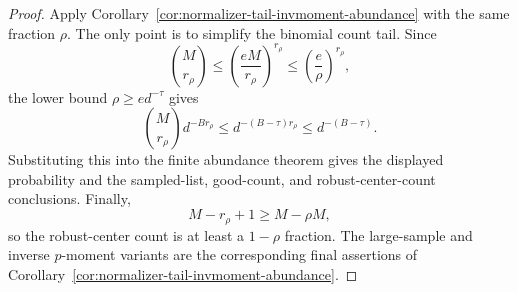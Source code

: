 \documentclass[11pt]{amsart}
\numberwithin{equation}{section}
\theoremstyle{definition}
\theoremstyle{remark}
\begin{document}
\begin{proof}
Apply Corollary~\ref{cor:normalizer-tail-invmoment-abundance} with the same
fraction \(\rho\).  The only point is to simplify the binomial count tail.  Since
\[
  \binom{M}{r_\rho}
  \le \left(\frac{eM}{r_\rho}\right)^{r_\rho}
  \le \left(\frac e\rho\right)^{r_\rho},
\]
the lower bound \(\rho\ge e d^{-\tau}\) gives
\[
  \binom{M}{r_\rho}d^{-B r_\rho}
  \le d^{-(B-\tau)r_\rho}
  \le d^{-(B-\tau)} .
\]
Substituting this into the finite abundance theorem gives the displayed
probability and the sampled-list, good-count, and robust-center-count
conclusions.  Finally,
\[
  M-r_\rho+1\ge M-\rho M,
\]
so the robust-center count is at least a \(1-\rho\) fraction.  The large-sample
and inverse \(p\)-moment variants are the corresponding final assertions of
Corollary~\ref{cor:normalizer-tail-invmoment-abundance}.
\end{proof}
\end{document}
